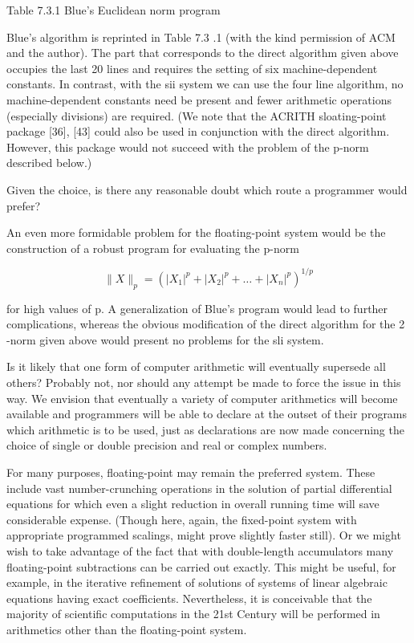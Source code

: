 \documentclass[10pt]{article}
\begin{document}
Table 7.3.1 Blue's Euclidean norm program

Blue's algorithm is reprinted in Table 7.3 .1 (with the kind permission of ACM and the author). The part that corresponds to the direct algorithm given above occupies the last 20 lines and requires the setting of six machine-dependent constants. In contrast, with the sii system we can use the four line algorithm, no machine-dependent constants need be present and fewer arithmetic operations (especially divisions) are required. (We note that the ACRITH sloating-point package [36], [43] could also be used in conjunction with the direct algorithm. However, this package would not succeed with the problem of the p-norm described below.)

Given the choice, is there any reasonable doubt which route a programmer would prefer?

An even more formidable problem for the floating-point system would be the construction of a robust program for evaluating the p-norm

$$
\|X\|_{p}=\left(\left|X_{1}\right|^{p}+\left|X_{2}\right|^{p}+\ldots+\left|X_{n}\right|^{p}\right)^{1 / p}
$$

for high values of p. A generalization of Blue's program would lead to further complications, whereas the obvious modification of the direct algorithm for the 2 -norm given above would present no problems for the sli system.

Is it likely that one form of computer arithmetic will eventually supersede all others? Probably not, nor should any attempt be made to force the issue in this way. We envision that eventually a variety of computer arithmetics will become available and programmers will be able to declare at the outset of their programs which arithmetic is to be used, just as declarations are now made concerning the choice of single or double precision and real or complex numbers.

For many purposes, floating-point may remain the preferred system. These include vast number-crunching operations in the solution of partial differential equations for which even a slight reduction in overall running time will save considerable expense. (Though here, again, the fixed-point system with appropriate programmed scalings, might prove slightly faster still). Or we might wish to take advantage of the fact that with double-length accumulators many floating-point subtractions can be carried out exactly. This might be useful, for example, in the iterative refinement of solutions of systems of linear algebraic equations having exact coefficients. Nevertheless, it is conceivable that the majority of scientific computations in the 21st Century will be performed in arithmetics other than the floating-point system.
\end{document}
